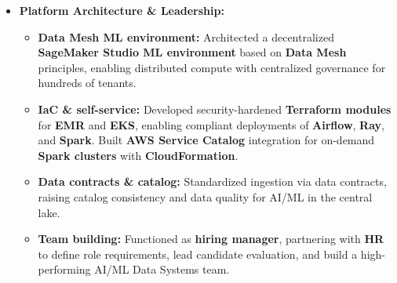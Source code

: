 \begin{itemize}[leftmargin=1.25em, topsep=1pt, partopsep=1.5pt]
\item \textbf{Platform Architecture \& Leadership:}
    \begin{itemize}[leftmargin=2.25em]
        \setlength\itemsep{0.2em}
        \item \textbf{Data Mesh ML environment:} Architected a decentralized \textbf{SageMaker Studio ML environment} based on \textbf{Data Mesh} principles, enabling distributed compute with centralized governance for hundreds of tenants.
        \item \textbf{IaC \& self-service:} Developed security-hardened \textbf{Terraform modules} for \textbf{EMR} and \textbf{EKS}, enabling compliant deployments of \textbf{Airflow}, \textbf{Ray}, and \textbf{Spark}. Built \textbf{AWS Service Catalog} integration for on-demand \textbf{Spark clusters} with \textbf{CloudFormation}.
        \item \textbf{Data contracts \& catalog:} Standardized ingestion via data contracts, raising catalog consistency and data quality for AI/ML in the central lake.
        \item \textbf{Team building:} Functioned as \textbf{hiring manager}, partnering with \textbf{HR} to define role requirements, lead candidate evaluation, and build a high-performing AI/ML Data Systems team.
    \end{itemize}

\end{itemize}